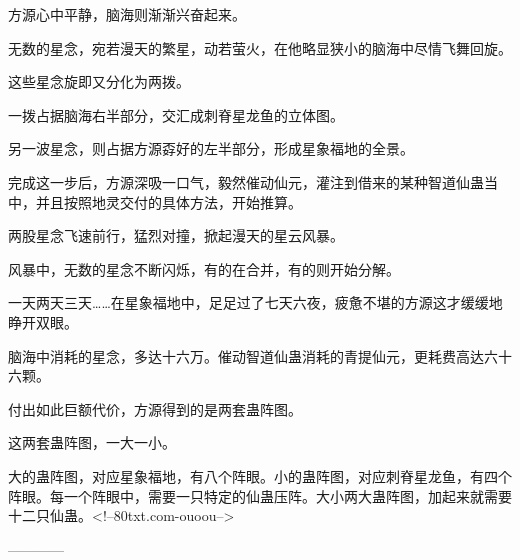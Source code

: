 \begin{this_body}
方源心中平静，脑海则渐渐兴奋起来。

无数的星念，宛若漫天的繁星，动若萤火，在他略显狭小的脑海中尽情飞舞回旋。

这些星念旋即又分化为两拨。

一拨占据脑海右半部分，交汇成刺脊星龙鱼的立体图。

另一波星念，则占据方源孬好的左半部分，形成星象福地的全景。

完成这一步后，方源深吸一口气，毅然催动仙元，灌注到借来的某种智道仙蛊当中，并且按照地灵交付的具体方法，开始推算。

两股星念飞速前行，猛烈对撞，掀起漫天的星云风暴。

风暴中，无数的星念不断闪烁，有的在合并，有的则开始分解。

一天两天三天……在星象福地中，足足过了七天六夜，疲惫不堪的方源这才缓缓地睁开双眼。

脑海中消耗的星念，多达十六万。催动智道仙蛊消耗的青提仙元，更耗费高达六十六颗。

付出如此巨额代价，方源得到的是两套蛊阵图。

这两套蛊阵图，一大一小。

大的蛊阵图，对应星象福地，有八个阵眼。小的蛊阵图，对应刺脊星龙鱼，有四个阵眼。每一个阵眼中，需要一只特定的仙蛊压阵。大小两大蛊阵图，加起来就需要十二只仙蛊。<!--80txt.com-ouoou-->

------------

\end{this_body}

